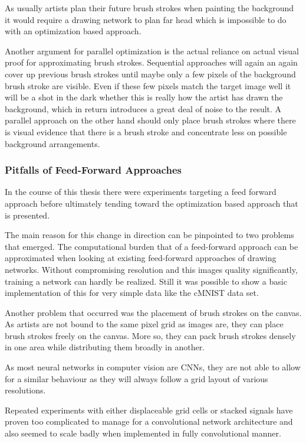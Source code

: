 As usually artists plan their future brush strokes when painting the background
it would require a drawing network to plan far head which is impossible to do with
an optimization based approach.

Another argument for parallel optimization is the actual reliance on actual visual
proof for approximating brush strokes.
Sequential approaches will again an again cover up previous brush strokes until maybe
only a few pixels of the background brush stroke are visible.
Even if these few pixels match the target image well it will be a shot in the dark
whether this is really how the artist has drawn the background, which in return
introduces a great deal of noise to the result.
A parallel approach on the other hand should only place brush strokes where there
is visual evidence that there is a brush stroke and concentrate less on possible
background arrangements.

\subsubsection{Pitfalls of Feed-Forward Approaches}

In the course of this thesis there were experiments targeting a feed forward approach
before ultimately tending toward the optimization based approach that is presented.

The main reason for this change in direction can be pinpointed to two problems that
emerged.
The computational burden that of a feed-forward approach can be approximated when
looking at existing feed-forward approaches of drawing networks.
Without compromising resolution and this images quality significantly, training
a network can hardly be realized.
Still it was possible to show a basic implementation of this for very simple data
like the cMNIST data set.  

Another problem that occurred was the placement of brush strokes on the canvas.
As artists are not bound to the same pixel grid as images are, they can place brush
strokes freely on the canvas.
More so, they can pack brush strokes densely in one area while distributing them
broadly in another.

As most neural networks in computer vision are CNNs, they are not able to allow for
a similar behaviour as they will always follow a grid layout of various resolutions.

Repeated experiments with either displaceable grid cells or stacked signals have proven
too complicated to manage for a convolutional network architecture and also seemed
to scale badly when implemented in fully convolutional manner.

